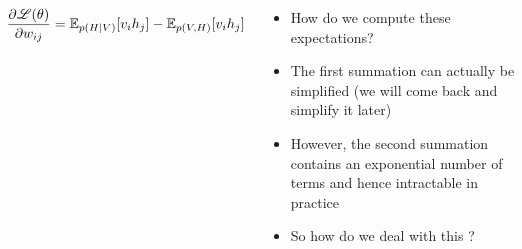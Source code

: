 \begin{frame}
	\begin{columns}
		\begin{overlayarea}{\textwidth}{\textheight}
			\begin{align*}
				\hspace{-0.5cm}\frac{\partial \mathscr{L}(\theta)}{\partial w_{ij}} = \mathbb{E}_{p(H|V)} [v_i h_j] - \mathbb{E}_{p(V,H)} [v_i h_j]
			\end{align*}
		\end{overlayarea}
		\begin{overlayarea}{\textwidth}{\textheight}
			\begin{itemize}
				\item<1-> How do we compute these expectations? 
				\item<2-> The first summation can actually be simplified (we will come back and simplify it later) 
				\item<3-> However, the second summation contains an exponential number of terms and hence intractable in practice
				\item<4-> So how do we deal with this ?
			\end{itemize}
		\end{overlayarea}
	\end{columns}
\end{frame}
